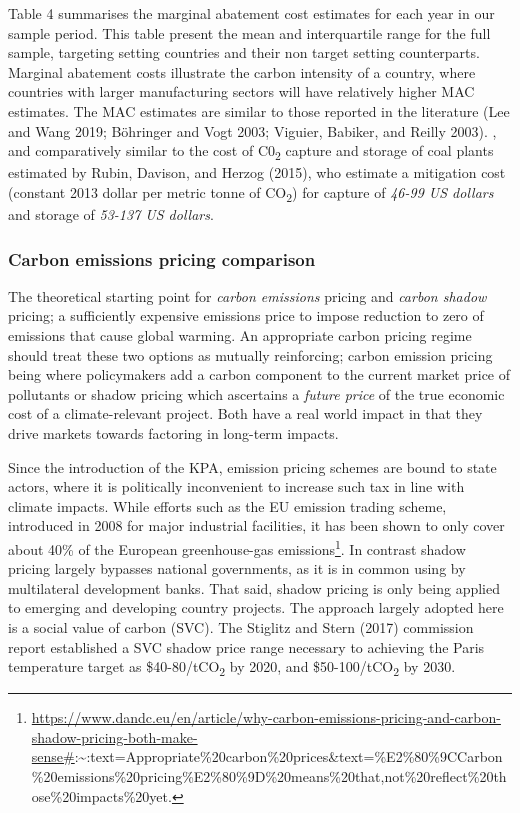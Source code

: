 \documentclass[
  10pt,
]{article}
\begin{document}
Table 4 summarises the marginal abatement cost estimates for each year
in our sample period. This table present the mean and interquartile
range for the full sample, targeting setting countries and their non
target setting counterparts. Marginal abatement costs illustrate the
carbon intensity of a country, where countries with larger manufacturing
sectors will have relatively higher MAC estimates. The MAC estimates are
similar to those reported in the literature (Lee and Wang 2019;
Böhringer and Vogt 2003; Viguier, Babiker, and Reilly 2003). , and
comparatively similar to the cost of C0\textsubscript{2} capture and
storage of coal plants estimated by Rubin, Davison, and Herzog (2015),
who estimate a mitigation cost (constant 2013 dollar per metric tonne of
CO\textsubscript{2}) for capture of \emph{46-99 US dollars} and storage
of \emph{53-137 US dollars}.

\hypertarget{carbon-emissions-pricing-comparison}{%
\subsubsection{Carbon emissions pricing
comparison}\label{carbon-emissions-pricing-comparison}}

The theoretical starting point for \emph{carbon emissions} pricing and
\emph{carbon shadow} pricing; a sufficiently expensive emissions price
to impose reduction to zero of emissions that cause global warming. An
appropriate carbon pricing regime should treat these two options as
mutually reinforcing; carbon emission pricing being where policymakers
add a carbon component to the current market price of pollutants or
shadow pricing which ascertains a \emph{future price} of the true
economic cost of a climate-relevant project. Both have a real world
impact in that they drive markets towards factoring in long-term
impacts.

Since the introduction of the KPA, emission pricing schemes are bound to
state actors, where it is politically inconvenient to increase such tax
in line with climate impacts. While efforts such as the EU emission
trading scheme, introduced in 2008 for major industrial facilities, it
has been shown to only cover about 40\% of the European greenhouse-gas
emissions\footnote{\url{https://www.dandc.eu/en/article/why-carbon-emissions-pricing-and-carbon-shadow-pricing-both-make-sense\#}:\textasciitilde:text=Appropriate\%20carbon\%20prices\&text=\%E2\%80\%9CCarbon\%20emissions\%20pricing\%E2\%80\%9D\%20means\%20that,not\%20reflect\%20those\%20impacts\%20yet.}.
In contrast shadow pricing largely bypasses national governments, as it
is in common using by multilateral development banks. That said, shadow
pricing is only being applied to emerging and developing country
projects. The approach largely adopted here is a social value of carbon
(SVC). The Stiglitz and Stern (2017) commission report established a SVC
shadow price range necessary to achieving the Paris temperature target
as \$40-80/tCO\textsubscript{2} by 2020, and
\$50-100/tCO\textsubscript{2} by 2030.
\end{document}

